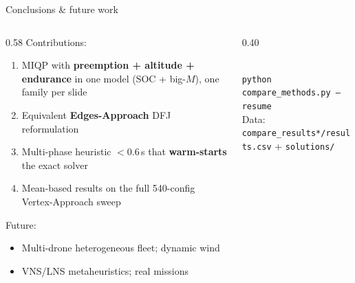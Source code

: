 \documentclass[aspectratio=169,10pt]{beamer}
\begin{document}
\begin{frame}{Conclusions \& future work}
  \begin{columns}[T,onlytextwidth]
    \begin{column}{0.58\textwidth}
      {\small Contributions:}
      \begin{enumerate}
        \item MIQP with \textbf{preemption + altitude + endurance} in one model (SOC + big-$M$), one family per slide
        \item Equivalent \textbf{Edges-Approach} DFJ reformulation
        \item Multi-phase heuristic $<0.6$\,s that \textbf{warm-starts} the exact solver
        \item Mean-based results on the full 540-config Vertex-Approach sweep
      \end{enumerate}
      \vspace{0.1cm}
      {\small Future:}
      \begin{itemize}
        \item Multi-drone heterogeneous fleet; dynamic wind
        \item VNS/LNS metaheuristics; real missions
      \end{itemize}
    \end{column}
    \begin{column}{0.40\textwidth}
      \centering
      \\[0.1cm]
      {\scriptsize \texttt{python compare\_methods.py --resume}\\[0.05cm]
      {\tiny Data: \texttt{compare\_results*/results.csv} + \texttt{solutions/}}}
    \end{column}
  \end{columns}
\end{frame}
\end{document}
